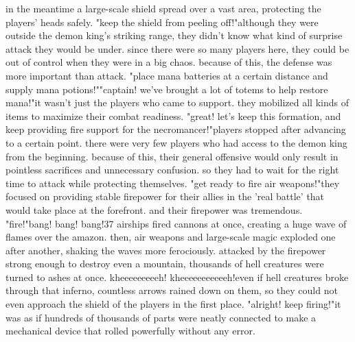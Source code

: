 in the meantime a large-scale shield spread over a vast area, protecting the players' heads safely.
"keep the shield from peeling off!"although they were outside the demon king's striking range, they didn't know what kind of surprise attack they would be under.
since there were so many players here, they could be out of control when they were in a big chaos.
 because of this, the defense was more important than attack.
"place mana batteries at a certain distance and supply mana potions!""captain! we've brought a lot of totems to help restore mana!"it wasn't just the players who came to support.
 they mobilized all kinds of items to maximize their combat readiness.
"great! let's keep this formation, and keep providing fire support for the necromancer!"players stopped after advancing to a certain point.
 there were very few players who had access to the demon king from the beginning.
 because of this, their general offensive would only result in pointless sacrifices and unnecessary confusion.
so they had to wait for the right time to attack while protecting themselves.
"get ready to fire air weapons!"they focused on providing stable firepower for their allies in the 'real battle' that would take place at the forefront.
 and their firepower was tremendous.
"fire!"bang! bang! bang!37 airships fired cannons at once, creating a huge wave of flames over the amazon.
 then, air weapons and large-scale magic exploded one after another, shaking the waves more ferociously.
 attacked by the firepower strong enough to destroy even a mountain, thousands of hell creatures were turned to ashes at once.
kheeeeeeeeeh! kheeeeeeeeeeeh!even if hell creatures broke through that inferno, countless arrows rained down on them, so they could not even approach the shield of the players in the first place.
"alright! keep firing!"it was as if hundreds of thousands of parts were neatly connected to make a mechanical device that rolled powerfully without any error.


 